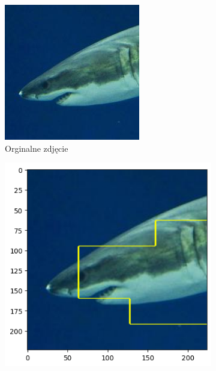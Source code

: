 \begin{figure}[h]
	\centering
	\begin{subfigure}[b]{0.3\textwidth}
		\includegraphics[width=.9\textwidth]{img/examples/appendix/n01484850_19435}
		\caption{Orginalne zdjęcie}  \label{}
	\end{subfigure}
	\begin{subfigure}[b]{0.3\textwidth}
		\centering\includegraphics[width=.9\textwidth]{img/examples/appendix/n01484850_19435_gradcam}

\end{subfigure}
\end{figure}
